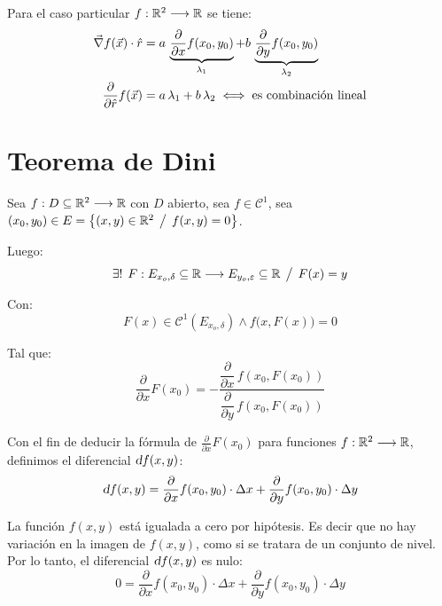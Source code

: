 Para el caso particular $f:\mathbb{R}^2 \longrightarrow \mathbb{R}$ se tiene:
\begin{align*}
    \Vec{\nabla} f(\Vec{x}) \cdot \hat{r} &= a \, \underbrace{\dfrac{\partial}{\partial x} f(x_0,y_0)}_{\lambda_1} + b \, \underbrace{\dfrac{\partial}{\partial y} f(x_0,y_0)}_{\lambda_2}
    \\
    \frac{\partial}{\partial \hat{r}} f(\Vec{x}) &= a\,\lambda_1 + b\,\lambda_2 \iff \textrm{es combinación lineal}
\end{align*}


\section{Teorema de Dini} %

Sea $f:D \subseteq \mathbb{R}^2 \longrightarrow \mathbb{R}$ con $D$ abierto, sea $f \in \mathcal{C}^1$, sea $(x_0,y_0) \in E = { \left\{ { (x,y) \in \mathbb{R}^2 \hspace{1ex} \big/ \hspace{1ex} f(x,y)=0 } \right\} }$.

Luego:
\begin{equation*}
    \exists ! \hspace{1ex} F:E_{x_o, \delta} \subseteq \mathbb{R} \longrightarrow E_{y_o, \varepsilon} \subseteq \mathbb{R} \hspace{1ex} \big/ \hspace{1ex} F(x)=y
\end{equation*}

Con:
\begin{equation*}
    F(x) \in \mathcal{C}^1(E_{x_o, \delta}) \land f \big( x,F(x) \big) = 0
\end{equation*}

Tal que:
\begin{equation*}
    \frac{\partial}{\partial x} F(x_0) = - \dfrac{\dfrac{\partial}{\partial x} \, f \left( x_0,F(x_0) \right)}{\dfrac{\partial}{\partial y} \, f \left( x_0,F(x_0) \right)}
\end{equation*}


Con el fin de deducir la fórmula de $\tfrac{\partial}{\partial x} F(x_0)$ para funciones $f:\mathbb{R}^2 \longrightarrow \mathbb{R}$, definimos el diferencial $\textsl{d} f(x,y)$:
\begin{equation*}
    \textsl{d} f(x,y) = \dfrac{\partial}{\partial x} f(x_0,y_0) \cdot \Delta x + \dfrac{\partial}{\partial y} f(x_0,y_0) \cdot \Delta y
\end{equation*}

La función $f(x,y)$ está igualada a cero por hipótesis.
Es decir que no hay variación en la imagen de $f(x,y)$, como si se tratara de un conjunto de nivel.
Por lo tanto, el diferencial $\textsl{d} f(x,y)$ es nulo:
\begin{equation*}
    0 = \dfrac{\partial}{\partial x} f(x_0,y_0) \cdot \Delta x + \dfrac{\partial}{\partial y} f(x_0,y_0) \cdot \Delta y
\end{equation*}

